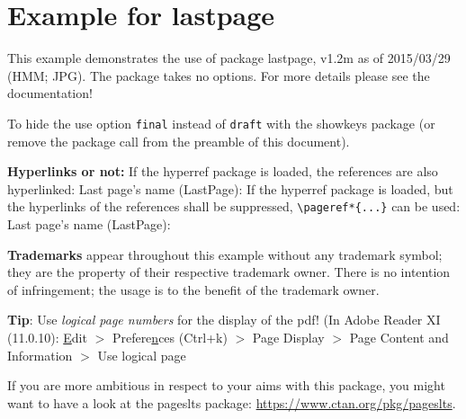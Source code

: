 \documentclass[british]{article}[2014/09/29]%
\begin{document}

\section*{Example for lastpage}

This example demonstrates the use of package\newline
\textsf{lastpage}, v1.2m as of 2015/03/29 (HMM; JPG).\newline
The package takes no options.\newline
For more details please see the documentation!\newline

\noindent \label{keys} To hide the \pageref{keys}{\qquad } use option
\texttt{final} instead of \texttt{draft} with the \textsf{showkeys}
package (or remove the package call from the preamble of
this document).\newline

\textbf{Hyperlinks or not:} If the \textsf{hyperref} package is loaded,
the references are also hyperlinked:\newline
\smallskip
Last page's name (LastPage): \pageref{LastPage}\newline
\noindent If the \textsf{hyperref} package is loaded, but the hyperlinks
of the references shall be suppressed, \verb|\pageref*{...}|
can be used:\newline
\smallskip
Last page's name (LastPage): \pageref*{LastPage}\newline

\textbf{Trademarks} appear throughout this example without any
trademark symbol; they are the property of their respective
trademark owner. There is no intention of infringement; the
usage is to the benefit of the trademark owner.\newline

\textbf{Tip}: Use \textit{logical page numbers} for
the display of the pdf!\newline
(In Adobe Reader XI (11.0.10): \underline{E}dit $>$
Prefere\underline{n}ces (Ctrl+k) $>$ Page Display $>$
Page Content and Information $>$ Use logical page
\newline

If you are more ambitious in respect to your aims with this package,
you might want to have a look at the \textsf{pageslts} package:\newline
\url{https://www.ctan.org/pkg/pageslts}.
\end{document}
